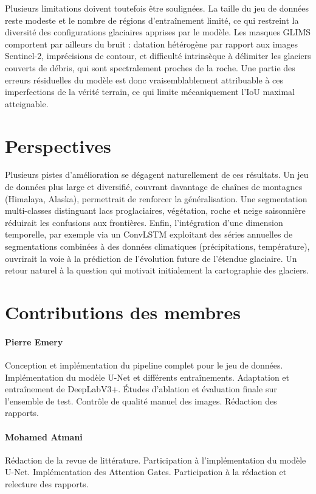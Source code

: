 \documentclass[11pt]{article}
\begin{document}
Plusieurs limitations doivent toutefois être soulignées. La taille
du jeu de données reste modeste et le nombre de régions
d'entraînement limité, ce qui restreint la diversité des
configurations glaciaires apprises par le modèle. Les masques
GLIMS comportent par ailleurs du bruit : datation hétérogène par
rapport aux images Sentinel-2, imprécisions de contour, et
difficulté intrinsèque à délimiter les glaciers couverts de
débris, qui sont spectralement proches de la roche. Une partie
des erreurs résiduelles du modèle est donc vraisemblablement
attribuable à ces imperfections de la vérité terrain, ce qui
limite mécaniquement l'IoU maximal atteignable.

\section{Perspectives}

Plusieurs pistes d'amélioration se dégagent naturellement de ces
résultats. Un jeu de données plus large et diversifié, couvrant
davantage de chaînes de montagnes (Himalaya, Alaska), permettrait
de renforcer la généralisation. Une segmentation multi-classes
distinguant lacs proglaciaires, végétation, roche et neige
saisonnière réduirait les confusions aux frontières. Enfin,
l'intégration d'une dimension temporelle, par exemple via un
ConvLSTM \citep{shi2015convlstm} exploitant des séries annuelles
de segmentations combinées à des données climatiques
(précipitations, température), ouvrirait la voie à la prédiction
de l'évolution future de l'étendue glaciaire. Un retour
naturel à la question qui motivait initialement la cartographie
des glaciers.
 
\pagebreak
\section{Contributions des membres}

\paragraph{Pierre Emery} Conception et implémentation du pipeline
complet pour le jeu de données. Implémentation du modèle U-Net et
différents entraînements. Adaptation et entraînement de DeepLabV3+.
Études d'ablation et évaluation finale sur l'ensemble de test.
Contrôle de qualité manuel des images. Rédaction des rapports.

\paragraph{Mohamed Atmani} Rédaction de la revue de littérature.
Participation à l'implémentation du modèle U-Net. Implémentation des
Attention Gates. Participation à la rédaction et relecture des rapports.
\end{document}
